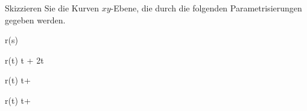 \begin{atiTask}[
  title = {Parametrisierung gegeben, Kurve gesucht}
]
  Skizzieren Sie die Kurven $xy$-Ebene, die durch die folgenden Parametrisierungen gegeben werden.
  \begin{atiSubequations}
    \item{
      \separate
      r(s)  {}
    }
    \item{
      \separate
      r(t) \cos t \vectorX + 2\sin t \vectorY
    }
    \item{
      \separate
      r(t)  t\vectorX + \vectorY
    }
    \item{
      \separate
      r(t)  t\vectorX + \vectorY
    }
  \end{atiSubequations}
\end{atiTask}